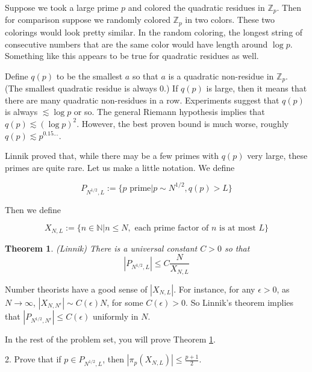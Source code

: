 \documentclass{amsart}
\newtheorem{theorem}{Theorem}
\newcommand{\NN}{\mathbb{N}}
\newcommand{\ZZ}{\mathbb{Z}}
\begin{document}
Suppose we took a large prime $p$ and colored the quadratic residues in $\ZZ_p$.   Then for comparison suppose we randomly colored $\ZZ_p$ in two colors.   These two colorings would look pretty similar.   In the random coloring,  the longest string of consecutive numbers that are the same color would have length around $\log p$.   Something like this appears to be true for quadratic residues as well. 

Define $q(p)$ to be the smallest $a$ so that $a$ is a quadratic non-residue in $\ZZ_p$.   (The smallest quadratic residue is always 0.)  If $q(p)$ is large, then it means that there are many quadratic non-residues in a row.    Experiments suggest that $q(p)$ is always $\lesssim \log p$ or so.   The general Riemann hypothesis implies that $q(p) \lesssim (\log p)^2$.   However,  the best proven bound is much worse,  roughly $q(p) \lesssim p^{0.15...}$.

Linnik proved that,  while there may be a few primes with $q(p)$ very large,  these primes are quite rare.   Let us make a little notation.  We define

\begin{equation} \label{defP}
P_{N^{1/2},L} := \{ p \textrm{ prime} | p \sim N^{1/2},  q(p) > L \}
\end{equation}

Then we define

\begin{equation} \label{defX}
X_{N,L} := \{ n \in \NN | n \le N, \textrm{ each prime factor of $n$ is at most } L \}
\end{equation}

\begin{theorem} \label{lqnr} (Linnik) There is a universal constant $C > 0$ so that
$$|P_{N^{1/2},L}| \le C \frac{N}{X_{N,L}}$$
\end{theorem}

Number theorists have a good sense of $|X_{N,L}|$.  For instance,  for any $\epsilon > 0$,  as $N \rightarrow \infty$,  $|X_{N, N^\epsilon}| \sim C(\epsilon) N$,  for some $C(\epsilon) > 0$.   So Linnik's theorem implies that $|P_{N^{1/2}, N^\epsilon}| \le C(\epsilon)$ uniformly in $N$.


In the rest of the problem set,  you will prove Theorem \ref{lqnr}.

\vskip10pt

2.  Prove that if $p \in P_{N^{1/2}, L}$,  then $| \pi_p(X_{N,L})| \le \frac{p+1}{2}$.

\vskip10pt
\end{document}
